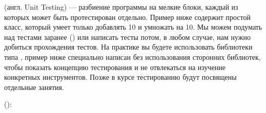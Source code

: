 \documentclass[letterpaper,10pt,russian]{sphinxmanual}
\begin{document}
\sphinxAtStartPar
{} (англ. Unit Testing) — разбиение программы на мелкие блоки, каждый из которых может быть протестирован отдельно. Пример ниже содержит простой класс, который умеет только добавлять 10 и умножать на 10. Мы можем подумать над тестами заранее () или написать тесты потом, в любом случае, нам нужно добиться прохождения тестов. На практике вы будете использовать библиотеки типа , пример ниже специально написан без использования сторонних библиотек, чтобы показать концепцию тестирования и не отвлекаться на изучение конкретных инструментов. Позже в курсе тестированию будут посвящены отдельные занятия.

\sphinxAtStartPar
():
\end{document}
